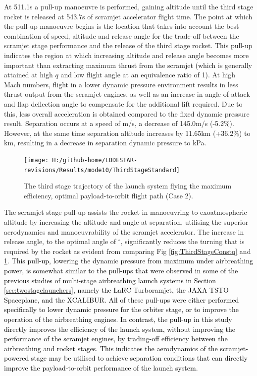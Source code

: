  At 511.1s a pull-up manoeuvre is performed, gaining altitude until the third stage rocket is released at \textcolor{black}{543.7}s of scramjet accelerator flight time. 
 The point at which the pull-up manoeuvre begins is the location that takes into account the best combination of speed, altitude and release angle for the trade-off between the scramjet stage performance and the release of the third stage rocket. This pull-up indicates the region at which increasing altitude and release angle becomes more important than extracting maximum thrust from the scramjet (which is generally attained at high $q$ and low flight angle at an equivalence ratio of 1).
At high Mach numbers, flight in a lower dynamic pressure environment results in less thrust output from the scramjet engines, as well as an increase in angle of attack and flap deflection angle to compensate for the additional lift required. Due to this, less overall acceleration is obtained compared to the fixed dynamic pressure result. Separation occurs at a speed of \secondthirdSeparationvStandardNoReturn m/s, a decrease of \textcolor{black}{145.0}m/s (\textcolor{black}{-5.2}\%). However, at the same time separation altitude increases by \textcolor{black}{11.65}km (+\textcolor{black}{36.2}\%) to \secondthirdSeparationAltqStandardNoReturn km, resulting in a decrease in separation dynamic pressure to \secondthirdSeparationqStandardNoReturn kPa. 
\begin{figure}[ht!]%
	\centering
	\texttt{[image: H:/github-home/LODESTAR-revisions/Results/mode10/ThirdStageStandard]}
	\caption{The third stage trajectory of the launch system flying the maximum efficiency, optimal payload-to-orbit flight path (Case 2).}
	\label{fig:ThirdStageStandardNoReturn}
\end{figure}
The scramjet stage pull-up assists the rocket in manoeuvring to exoatmospheric altitude by increasing the altitude and angle at separation, utilising the superior aerodynamics and manoeuvrability of the scramjet accelerator. The increase in release angle, to the optimal angle of \secondthirdSeparationgammaStandardNoReturn$^\circ$, significantly reduces the turning that is required by the rocket as evident from comparing Fig \ref{fig:ThirdStageConstq} and \ref{fig:ThirdStageStandardNoReturn}. 
\textcolor{black}{This pull-up, lowering the dynamic pressure from maximum under airbreathing power, is somewhat similar to the pull-ups that were observed in some of the previous studies of multi-stage airbreathing launch systems in Section \ref{sec:twostagelaunchers}, namely the LaRC Turboramjet\cite{Wilhite1991}, the JAXA TSTO Spaceplane\cite{Fujikawa2017}, and the XCALIBUR\cite{Bradford2002}. All of these pull-ups were either performed specifically to lower dynamic pressure for the orbiter stage\cite{Wilhite1991,Bradford2002}, or to improve the operation of the airbreathing engines\cite{Fujikawa2017}. In contrast, the pull-up in this study directly improves the efficiency of the launch system, without improving the performance of the scramjet engines, by trading-off efficiency between the airbreathing and rocket stages. This indicates the aerodynamics of the scramjet-powered stage may be utilised to achieve separation conditions that can directly improve the payload-to-orbit performance of the launch system. }

